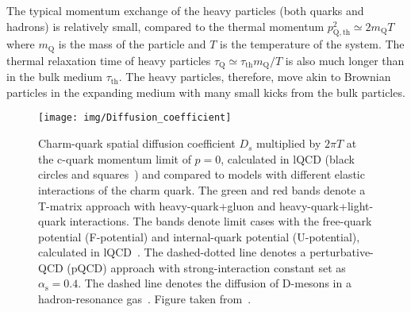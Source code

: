 The typical momentum exchange of the heavy particles (both quarks and hadrons) is relatively small, compared to the thermal momentum $p^2_\mathrm{Q,th} \simeq 2m_\mathrm{Q}T$~\cite{Prino_Rapp_HF} where $m_\mathrm{Q}$ is the mass of the particle and $T$ is the temperature of the system\@. The thermal relaxation 
time of heavy particles  $\tau_\mathrm{Q} \simeq \tau_\mathrm{th}m_\mathrm{Q}/T$ is also much longer than in the bulk medium $\tau_\mathrm{th}$\@. The heavy particles, therefore, move akin to Brownian particles in the expanding medium with many small kicks from the bulk particles.


\begin{figure}[!htb]
\begin{center}
 \texttt{[image: img/Diffusion\_coefficient]}
\caption[Charm-quark spatial diffusion coefficient $D_s$.]{\label{diffusion}Charm-quark spatial diffusion coefficient $D_s$ multiplied by $2\pi T$ at the c-quark momentum limit of $p = 0$, calculated in lQCD (black circles and squares~\cite{BanerjeeLattice,DingLattice}) and compared to models with different elastic interactions of the charm quark. The green and red bands denote a T-matrix approach with heavy-quark+gluon and heavy-quark+light-quark interactions. The bands denote limit cases with the free-quark potential (F-potential) and internal-quark potential (U-potential), calculated in lQCD~\cite{Tmatrix}\@. The dashed-dotted line denotes a perturbative-QCD (pQCD) approach with strong-interaction constant set as $\alpha_\mathrm{s} = 0.4$\@. The dashed line denotes the diffusion of D-mesons in a hadron-resonance gas~\cite{DmesonHRG}\@. Figure taken from~\cite{summaryHF}.}
\end{center}
\end{figure}


